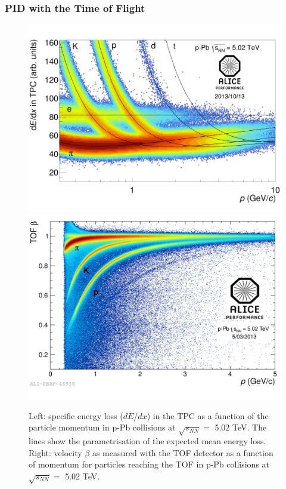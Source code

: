 \documentclass[b5paper,10pt,twoside,oldstyle,classica]{toptesi}
\begin{document}
\subsubsection{PID with the Time of Flight}
\begin{figure}[tb]
\begin{center}
{\includegraphics[scale = 0.092]{2013-Oct-18-dEdx_pPb_zoom_logo.png}}
\hspace{0cm}
{\includegraphics[scale = 0.087]{2013-Mar-06-betap_v5.png}}
\caption{Left: specific energy loss ($dE/dx$) in the TPC as a function of the particle momentum in p-Pb collisions at $\sqrt{s_{NN}} =$ 5.02 TeV. The lines show the parametrisation of the expected mean energy loss. Right: velocity $\beta$ as measured with the TOF detector as a function of momentum for particles reaching the TOF in p-Pb collisions at $\sqrt{s_{NN}} =$ 5.02 TeV.}
\label{PID}
\end{center}
\end{figure}
\end{document}

